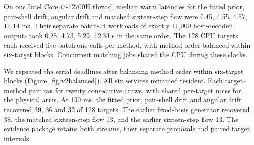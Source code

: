On one Intel Core i7-12700H thread, median warm latencies for the fitted prior, pair-shell drift, angular drift and matched sixteen-step flow were 0.45, 4.55, 4.57, 17.14 ms. Their separate batch-24 workloads of exactly 10,000 host-decoded outputs took 0.28, 4.73, 5.29, 12.34 s in the same order. The 128 CPU targets each received five batch-one calls per method, with method order balanced within six-target blocks. Concurrent matching jobs shared the CPU during these clocks.

We repeated the serial deadlines after balancing method order within six-target blocks (Figure~\ref{fig:v2balanced}). All six services remained resident. Each target--method pair ran for twenty consecutive draws, with shared per-target noise for the physical arms. At 100 ms, the fitted prior, pair-shell drift and angular drift recovered 39, 36 and 32 of 128 targets. The earlier fixed-basis generator recovered 38, the matched sixteen-step flow 13, and the earlier sixteen-step flow 13. The evidence package retains both streams, their separate proposals and paired target intervals.

